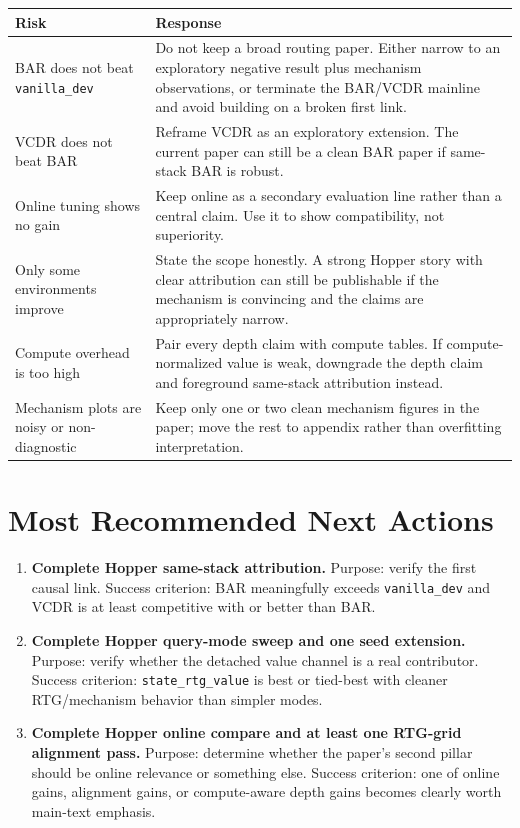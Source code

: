\documentclass[11pt]{article}
\newcommand{\vanilla}{\texttt{vanilla\_dev}}
\begin{document}
\begin{tabularx}{\textwidth}{>{\raggedright\arraybackslash}p{}X}
\toprule
\textbf{Risk} & \textbf{Response} \\
\midrule
BAR does not beat \vanilla{} & Do not keep a broad routing paper. Either narrow to an exploratory negative result plus mechanism observations, or terminate the BAR/VCDR mainline and avoid building on a broken first link. \\
VCDR does not beat BAR & Reframe VCDR as an exploratory extension. The current paper can still be a clean BAR paper if same-stack BAR is robust. \\
Online tuning shows no gain & Keep online as a secondary evaluation line rather than a central claim. Use it to show compatibility, not superiority. \\
Only some environments improve & State the scope honestly. A strong Hopper story with clear attribution can still be publishable if the mechanism is convincing and the claims are appropriately narrow. \\
Compute overhead is too high & Pair every depth claim with compute tables. If compute-normalized value is weak, downgrade the depth claim and foreground same-stack attribution instead. \\
Mechanism plots are noisy or non-diagnostic & Keep only one or two clean mechanism figures in the paper; move the rest to appendix rather than overfitting interpretation. \\
\bottomrule
\end{tabularx}

\section{Most Recommended Next Actions}

\begin{enumerate}
  \item \textbf{Complete Hopper same-stack attribution.} Purpose: verify the first causal link. Success criterion: BAR meaningfully exceeds \vanilla{} and VCDR is at least competitive with or better than BAR.
  \item \textbf{Complete Hopper query-mode sweep and one seed extension.} Purpose: verify whether the detached value channel is a real contributor. Success criterion: \texttt{state\_rtg\_value} is best or tied-best with cleaner RTG/mechanism behavior than simpler modes.
  \item \textbf{Complete Hopper online compare and at least one RTG-grid alignment pass.} Purpose: determine whether the paper's second pillar should be online relevance or something else. Success criterion: one of online gains, alignment gains, or compute-aware depth gains becomes clearly worth main-text emphasis.
\end{enumerate}
\end{document}
